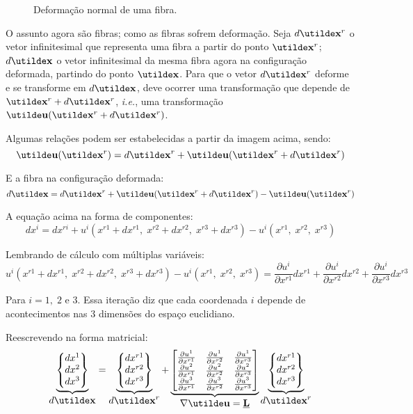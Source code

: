 \begin{figure}[H]
	\centering
	\caption{Deformação normal de uma fibra.}
	\vspace*{5mm}
	
\end{figure}

O assunto agora são fibras; como as fibras sofrem deformação. Seja $d\vt{x}^r$ o vetor infinitesimal que representa uma fibra a partir do ponto $\vt{x}^r$; $d\vt{x}$ o vetor infinitesimal da mesma fibra agora na configuração deformada, partindo do ponto $\vt{x}$.
Para que o vetor $d\vt{x}^r$ deforme e se transforme em $d\vt{x}$, deve ocorrer uma transformação que depende de $\vt{x}^r+d\vt{x}^r$, \textit{i.e.}, uma transformação $\vt{u}(\vt{x}^r+d\vt{x}^r)$.

Algumas relações podem ser estabelecidas a partir da imagem acima, sendo:
\[\vt{u}(\vt{x}^r)=d\vt{x}^r+\vt{u}(\vt{x}^r+d\vt{x}^r)\]

E a fibra na configuração deformada:	
\[d\vt{x}=d\vt{x}^r+\vt{u}(\vt{x}^r+d\vt{x}^r)-\vt{u}(\vt{x}^r)\]

A equação acima na forma de componentes:
\[dx^i=dx^{ri}+u^i(x^{r1}+dx^{r1},\;x^{r2}+dx^{r2},\;x^{r3}+dx^{r3})-u^i(x^{r1},\;x^{r2},\;x^{r3})\]

Lembrando de cálculo com múltiplas variáveis:
\[u^i(x^{r1}+dx^{r1},\;x^{r2}+dx^{r2},\;x^{r3}+dx^{r3})-u^i(x^{r1},\;x^{r2},\;x^{r3})=\frac{\partial u^i}{\partial x^{r1}}dx^{r1}+\frac{\partial u^i}{\partial x^{r2}}dx^{r2}+\frac{\partial u^i}{\partial x^{r3}}dx^{r3}\]

Para $i=1,\;2$ e $3$. Essa iteração diz que cada coordenada $i$ depende de acontecimentos nas $3$ dimensões do espaço euclidiano.

Reescrevendo na forma matricial:
\[
	\underbrace{
	\begin{Bmatrix}
		dx^1 \\ dx^2 \\ dx^3
	\end{Bmatrix}
	}_{\displaystyle d\vt{x}}
	=
	\underbrace{
	\begin{Bmatrix}
		dx^{r1} \\ dx^{r2} \\ dx^{r3}
	\end{Bmatrix}
	}_{\displaystyle d\vt{x}^r}
	+
	\underbrace{
	\begin{bmatrix}
		\frac{\partial u^1}{\partial x^{r1}} & \frac{\partial u^1}{\partial x^{r2}} & \frac{\partial u^1}{\partial x^{r3}} \\
		\frac{\partial u^2}{\partial x^{r1}} & \frac{\partial u^2}{\partial x^{r2}} & \frac{\partial u^2}{\partial x^{r3}} \\
		\frac{\partial u^3}{\partial x^{r1}} & \frac{\partial u^3}{\partial x^{r2}} & \frac{\partial u^3}{\partial x^{r3}}
	\end{bmatrix}
	}_{\displaystyle\nabla\vt{u}=\ts{L}}
	\underbrace{
	\begin{Bmatrix}
		dx^{r1} \\ dx^{r2} \\ dx^{r3}
	\end{Bmatrix}
	}_{\displaystyle d\vt{x}^r}
\]


